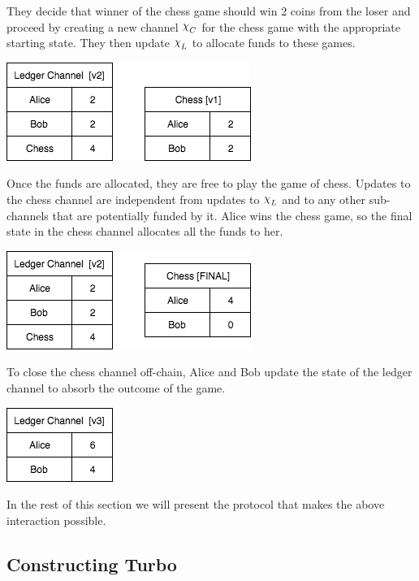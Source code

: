 \documentclass{article}
\DeclareRobustCommand{\rchi}{{\mathpalette\irchi\relax}}
\newcommand{\irchi}[2]{\raisebox{\depth}{$#1\chi$}} %
\theoremstyle{definition}
\begin{document}
They decide that winner of the chess game should win 2 coins from the loser and proceed
by creating a new channel $\rchi_C$ for the chess game with the appropriate starting state.
They then update $\rchi_L$ to allocate funds to these games.

\begin{center}
  \includegraphics[scale=0.5]{turbo_open} %
\end{center}

Once the funds are allocated, they are free to play the game of chess.
Updates to the chess channel are independent from updates to $\rchi_L$ and to
any other sub-channels that are potentially funded by it. 
Alice wins the chess game, so the final state in the chess channel allocates all the
funds to her.

\begin{center}
  \includegraphics[scale=0.5]{turbo_close} %
\end{center}

To close the chess channel off-chain, Alice and Bob update the state of the ledger channel to absorb the outcome of the game.

\begin{center}
  \includegraphics[scale=0.5]{turbo_finish} %
\end{center}

In the rest of this section we will present the protocol that makes the above interaction
possible.

\subsection{Constructing Turbo}
\end{document}
